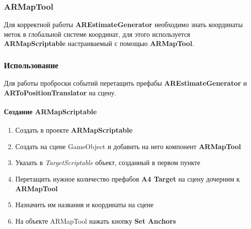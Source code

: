 \documentclass[a4paper, 11pt, titlepage]{article}
\begin{document}
      \subsubsection{ARMapTool}
        Для корректной работы \textbf{AREstimateGenerator} необходимо знать координаты меток в глобальной системе координат, для 
        этого используется \textbf{ARMapScriptable} настраиваемый с помощью \textbf{ARMapTool}.\\
        \begin{center}
        \end{center}  

      \subsubsection{Использование}
        Для работы проброски событий перетащить префабы \textbf{AREstimateGenerator} и \textbf{ARToPositionTranslator}
        на сцену.
        \paragraph{Создание ARMapScriptable}
          \begin{enumerate}
            \item Создать в проекте \textbf{ARMapScriptable}
            \item Создать на сцене GameObject и добавить на него компонент \textbf{ARMapTool}
            \item Указать в \textit{TargetScriptable} объект, созданный в первом пункте
            \item Перетащить нужное количество префабов \textbf{A4 Target} на сцену дочерним к \textbf{ARMapTool}
            \item Назначить им названия и координаты на сцене
            \item На объекте ARMapTool нажать кнопку \textbf{Set Anchors}
          \end{enumerate}
\end{document}
